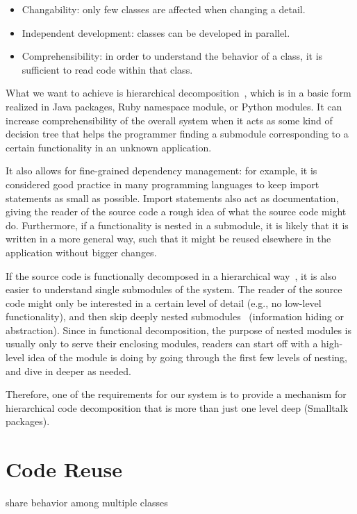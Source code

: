 \begin{itemize}
	\item Changability: only few classes are affected when changing a detail.
	\item Independent development: classes can be developed in parallel.
	\item Comprehensibility: in order to understand the behavior of a class, it is sufficient to read code within that class.
\end{itemize}

What we want to achieve is hierarchical decomposition~\cite{Blume:1999:HM:325478.325518}, which is in a basic form realized in Java packages, Ruby namespace module, or Python modules. It can increase comprehensibility of the overall system when it acts as some kind of decision tree that helps the programmer finding a submodule corresponding to a certain functionality in an unknown application. 

It also allows for fine-grained dependency management: for example, it is considered good practice in many programming languages to keep import statements as small as possible. Import statements also act as documentation, giving the reader of the source code a rough idea of what the source code might do. Furthermore, if a functionality is nested in a submodule, it is likely that it is written in a more general way, such that it might be reused elsewhere in the application without bigger changes.

If the source code is functionally decomposed in a hierarchical way~\cite{Tsui:2009:ESE:1823101}, it is also easier to understand single submodules of the system. The reader of the source code might only be interested in a certain level of detail (e.g., no low-level functionality), and then skip deeply nested submodules~\cite{hierarch1} (information hiding or abstraction). Since in functional decomposition, the purpose of nested modules is usually only to serve their enclosing modules, readers can start off with a high-level idea of the module is doing by going through the first few levels of nesting, and dive in deeper as needed.

Therefore, one of the requirements for our system is to provide a mechanism for hierarchical code decomposition that is more than just one level deep (Smalltalk packages).

\section{Code Reuse}
share behavior among multiple classes
